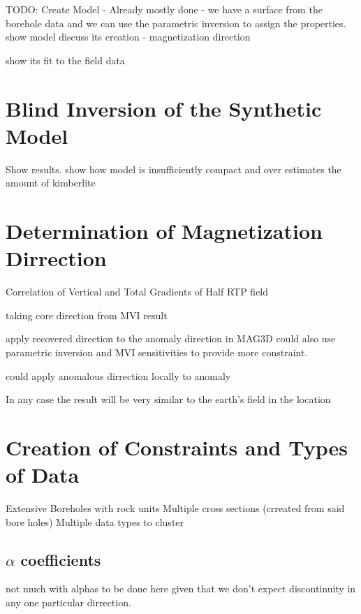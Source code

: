 TODO: Create Model
- Already mostly done
- we have a surface from the borehole data and we can use the parametric inversion to assign the properties.
show model
discuss its creation
- magnetization direction

show its fit to the field data

\section{Blind Inversion of the Synthetic Model}
\label{sec:Blind Inversion of the Synthetic Model:TKC}

Show results. show how model is insufficiently compact and over estimates the amount of kimberlite

\section{Determination of Magnetization Dirrection}
\label{sec:Determination of Magnetization Dirrection}

Correlation of Vertical and Total Gradients of Half RTP field \cite{dannemiller2006MagDirection}

taking core direction from MVI result 

apply recovered direction to the anomaly direction in MAG3D
could also use parametric inversion and MVI sensitivities to provide more constraint.

could apply anomalous dirrection locally to anomaly 

In any case the result will be very similar to the earth's field in the location

\section{Creation of Constraints and Types of Data}
\label{sec:Creation of Constraints:TKC}

Extensive Boreholes with rock units
Multiple cross sections (crreated from said bore holes)
Multiple data types to cluster



\subsection{$\alpha$ coefficients}
\label{sec:alpha coefficients:TKC}

not much with alphas to be done here given that we don't expect discontinuity in any one particular dirrection.

